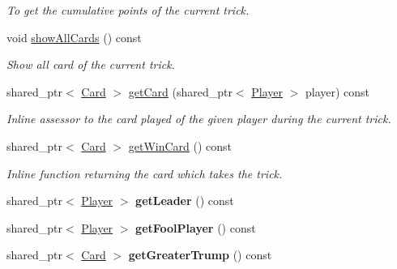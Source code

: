 \begin{DoxyCompactItemize}
\begin{DoxyCompactList}\small\item\em To get the cumulative points of the current trick. \end{DoxyCompactList}\item 
\hypertarget{classTrick_af156d49d692f5168320ebc30aa084da1}{void \hyperlink{classTrick_af156d49d692f5168320ebc30aa084da1}{show\-All\-Cards} () const }\label{classTrick_af156d49d692f5168320ebc30aa084da1}

\begin{DoxyCompactList}\small\item\em Show all card of the current trick. \end{DoxyCompactList}\item 
\hypertarget{classTrick_a1649b27628cb224f3eb98f56ea00f5ac}{shared\-\_\-ptr$<$ \hyperlink{classCard}{Card} $>$ \hyperlink{classTrick_a1649b27628cb224f3eb98f56ea00f5ac}{get\-Card} (shared\-\_\-ptr$<$ \hyperlink{classPlayer}{Player} $>$ player) const }\label{classTrick_a1649b27628cb224f3eb98f56ea00f5ac}

\begin{DoxyCompactList}\small\item\em Inline assessor to the card played of the given player during the current trick. \end{DoxyCompactList}\item 
\hypertarget{classTrick_ae5e65fbe08d6df0ca71224e465424c6b}{shared\-\_\-ptr$<$ \hyperlink{classCard}{Card} $>$ \hyperlink{classTrick_ae5e65fbe08d6df0ca71224e465424c6b}{get\-Win\-Card} () const }\label{classTrick_ae5e65fbe08d6df0ca71224e465424c6b}

\begin{DoxyCompactList}\small\item\em Inline function returning the card which takes the trick. \end{DoxyCompactList}\item 
\hypertarget{classTrick_a87cf6697a5f9f417e19c2749e73ae2be}{shared\-\_\-ptr$<$ \hyperlink{classPlayer}{Player} $>$ {\bfseries get\-Leader} () const }\label{classTrick_a87cf6697a5f9f417e19c2749e73ae2be}

\item 
\hypertarget{classTrick_a4d43afa1ae8417094be02494852f7c56}{shared\-\_\-ptr$<$ \hyperlink{classPlayer}{Player} $>$ {\bfseries get\-Fool\-Player} () const }\label{classTrick_a4d43afa1ae8417094be02494852f7c56}

\item 
\hypertarget{classTrick_a21f11527bb41c8a9a5ad3706c220ba4c}{shared\-\_\-ptr$<$ \hyperlink{classCard}{Card} $>$ {\bfseries get\-Greater\-Trump} () const }\label{classTrick_a21f11527bb41c8a9a5ad3706c220ba4c}

\end{DoxyCompactItemize}


